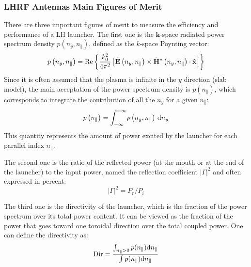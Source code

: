\subsubsection{LHRF Antennas Main Figures of Merit}
There are three important figures of merit to measure the efficiency and
performance of a LH launcher. The first one is the $\mathbf{k}$-space radiated power spectrum density $ p(n_y, n_\parallel)$, defined as the $k$-space Poynting vector:
\begin{equation} 
 p
\left(n_{y},n_{\parallel}\right)
=\Re\left\{ \frac{k_{0}^{2}}{4\pi^{2}}
\left[\tilde{\mathbf{E}}
\left(n_{y},n_{\parallel}\right)
\times
\tilde{\mathbf{H}}^{*}\left(n_{y},n_{\parallel}\right)
\cdot\hat{{\mathbf x}}
\right]
\right\} 
\end{equation}
Since it is often assumed that the plasma is infinite in the $y$ direction (slab model), the main acceptation of the power spectrum density is $ p(n_\parallel)$, which corresponds to integrate the contribution of all the $n_{y}$ for a given $n_{\parallel}$:
\begin{equation}
 p\left(n_{\parallel}\right)=\int_{-\infty}^{+\infty}\!  p\left(n_{y},n_{\parallel}\right)\, {\mathrm{d}} n_y
\end{equation}
This quantity represents the amount of power excited by the launcher for each parallel index $n_\parallel$. %

The second one is the ratio of the reflected power (at the mouth or at the end of the launcher) to the input power, named the reflection coefficient $|\Gamma|^2 $ and often expressed in percent:
\begin{equation}
	|\Gamma|^2 = P_r/P_i
\end{equation} 

The third one is the directivity of the launcher, which is the fraction of the power spectrum over its total power content. It can be viewed as the fraction of the power that goes toward one toroidal direction over the total coupled power. One can define the directivity as:
\begin{equation}
\mathrm{Dir} = \frac{\int_{n_\parallel > 0}   p(n_\parallel) {\mathrm{d}} n_\parallel}{\int  p(n_\parallel) {\mathrm{d}} n_\parallel} 
\end{equation}

